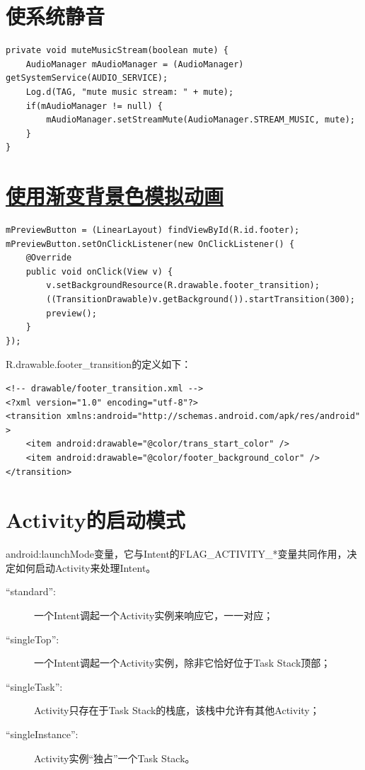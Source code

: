 ﻿\documentclass[a4paper,11pt]{article}
\begin{document}
  \section[使系统静音]{使系统静音}
  \begin{verbatim}
private void muteMusicStream(boolean mute) {
    AudioManager mAudioManager = (AudioManager) getSystemService(AUDIO_SERVICE);
    Log.d(TAG, "mute music stream: " + mute);
    if(mAudioManager != null) {
        mAudioManager.setStreamMute(AudioManager.STREAM_MUSIC, mute);
    }
}
  \end{verbatim}

  \section[使用渐变背景色模拟动画]{\underline{使用渐变背景色模拟动画}}
  \begin{verbatim}
mPreviewButton = (LinearLayout) findViewById(R.id.footer);
mPreviewButton.setOnClickListener(new OnClickListener() {
    @Override
    public void onClick(View v) {
        v.setBackgroundResource(R.drawable.footer_transition);
        ((TransitionDrawable)v.getBackground()).startTransition(300);
        preview();
    }
});
  \end{verbatim}

  R.drawable.footer\_transition的定义如下：

  \begin{verbatim}
<!-- drawable/footer_transition.xml -->
<?xml version="1.0" encoding="utf-8"?>
<transition xmlns:android="http://schemas.android.com/apk/res/android" >
    <item android:drawable="@color/trans_start_color" />
    <item android:drawable="@color/footer_background_color" />
</transition>
  \end{verbatim}


  \section[Activity的启动模式]{Activity的启动模式}
  android:launchMode变量，它与Intent的FLAG\_ACTIVITY\_*变量共同作用，决定如何启动Activity来处理Intent。

  \begin{description}
    \item[``standard'':] 一个Intent调起一个Activity实例来响应它，一一对应；
    \item[``singleTop'':] 一个Intent调起一个Activity实例，除非它恰好位于Task Stack顶部；
    \item[``singleTask'':] Activity只存在于Task Stack的栈底，该栈中允许有其他Activity；
    \item[``singleInstance'':] Activity实例“独占”一个Task Stack。
  \end{description}
\end{document}
